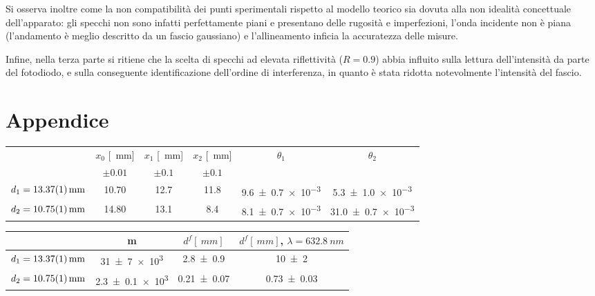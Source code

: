 \documentclass[10pt,oneside,a4paper]{article}
\begin{document}
\begin{multicols}{2}
Si osserva inoltre come la non compatibilità dei punti sperimentali rispetto al modello teorico sia dovuta alla non idealità concettuale dell'apparato: gli specchi non sono infatti perfettamente piani e presentano delle rugosità e imperfezioni, l'onda incidente non è piana (l'andamento è meglio descritto da un fascio gaussiano) e l'allineamento inficia la accuratezza delle misure.

Infine, nella terza parte si ritiene che la scelta di specchi ad elevata riflettività ($R=0.9$) abbia influito sulla lettura dell'intensità da parte del fotodiodo, e sulla conseguente identificazione dell'ordine di interferenza, in quanto è stata ridotta notevolmente l'intensità del fascio.

\end{multicols}


\newpage
\section{Appendice}

\begin{center}
\label{tab:stimaLambda}
\begin{tabular}{c|c|c|c|c|c}
 & $x_0$ [\SI{}{mm}] & $x_1$ [\SI{}{mm}] & $x_2$ [\SI{}{mm}] & $\theta_1$  & $\theta_2$ \\
 & $\pm 0.01$ & $\pm 0.1$ & $\pm 0.1$ & & \\
\hline 
$d_1 = \SI{13.37 \pm 0.01}{mm}$ & 10.70  & 12.7 & 11.8 &    \SI{9.6 \pm 0.7 e-3}{} & \SI{5.3 \pm 1.0 e-3}{} \\
$d_2 = \SI{10.75 \pm 0.01}{mm}$ & 14.80   & 13.1 & 8.4  & \SI{8.1 \pm 0.7 e-3}{} & \SI{31.0 \pm 0.7 e-3}{} \\
\hline
\end{tabular}
\newline
\vspace*{0.4cm}
\newline
\begin{tabular}{c|c|c|c}
& m & $d^f [\SI{}{mm}]$ & $d^f [\SI{}{mm}]$, $\lambda=\SI{632.8}{nm}$ \\
\hline
$d_1 = \SI{13.37 \pm 0.01}{mm}$ & \SI{31 \pm 7 e3}{} & \SI{2.8 \pm 0.9}{} & \SI{10 \pm 2}{}\\
$d_2 = \SI{10.75 \pm 0.01}{mm}$ & \SI{2.3 \pm 0.1 e3}{}  & \SI{0.21 \pm 0.07}{} & \SI{0.73 \pm 0.03}{}\\
\hline
\end{tabular}
\end{center}
\end{document}
